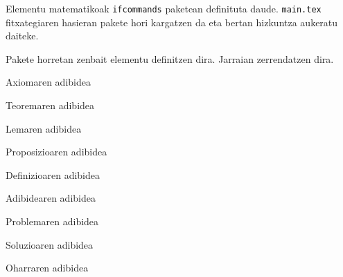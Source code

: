 Elementu matematikoak \texttt{ifcommands} paketean definituta daude. \texttt{main.tex} fitxategiaren hasieran pakete hori kargatzen da eta bertan hizkuntza aukeratu daiteke.

Pakete horretan zenbait elementu definitzen dira. Jarraian zerrendatzen dira.

\begin{ifaxiom}
	Axiomaren adibidea
\end{ifaxiom}

\begin{iftheorem}
	Teoremaren adibidea
\end{iftheorem}

\begin{iflemma}
	Lemaren adibidea
\end{iflemma}

\begin{ifproposition}
	Proposizioaren adibidea
\end{ifproposition}

\begin{ifdefinition}
	Definizioaren adibidea
\end{ifdefinition}

\begin{ifexample}
	Adibidearen adibidea
\end{ifexample}

\begin{ifproblem}
	Problemaren adibidea
\end{ifproblem}

\begin{ifsolution}
	Soluzioaren adibidea
\end{ifsolution}

\begin{ifremark}
	Oharraren adibidea
\end{ifremark}


